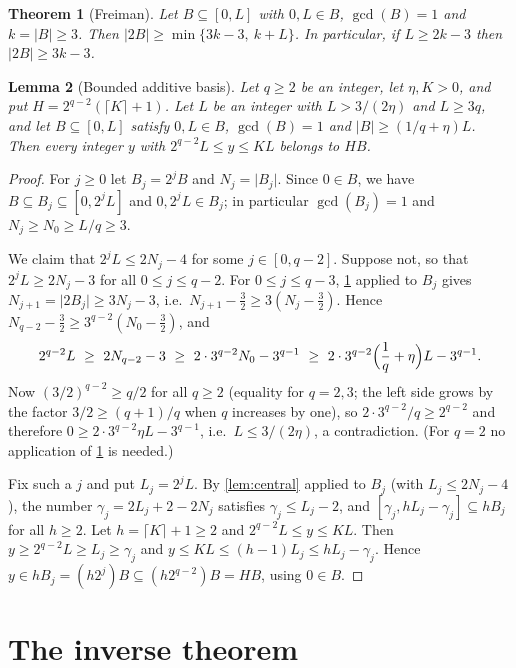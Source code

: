 \documentclass[11pt,reqno]{amsart}
\numberwithin{equation}{section}
\newtheorem{theorem}{Theorem}[section]
\newtheorem{lemma}[theorem]{Lemma}
\theoremstyle{definition}
\theoremstyle{remark}
\newcommand{\card}[1]{\lvert #1\rvert}
\newcommand{\ceil}[1]{\lceil #1\rceil}
\begin{document}
\begin{theorem}[Freiman]\label{thm:freiman}
Let $B\subseteq[0,L]$ with $0,L\in B$, $\gcd(B)=1$ and $k=\card B\ge3$. Then $\card{2B}\ge\min\{3k-3,\ k+L\}$. In particular, if $L\ge2k-3$ then $\card{2B}\ge3k-3$.
\end{theorem}

\begin{lemma}[Bounded additive basis]\label{lem:basis}
Let $q\ge2$ be an integer, let $\eta,K>0$, and put $H=2^{q-2}(\ceil K+1)$. Let $L$ be an integer with $L>3/(2\eta)$ and $L\ge3q$, and let $B\subseteq[0,L]$ satisfy $0,L\in B$, $\gcd(B)=1$ and $\card B\ge(1/q+\eta)L$. Then every integer $y$ with $2^{q-2}L\le y\le KL$ belongs to $HB$.
\end{lemma}

\begin{proof}
For $j\ge0$ let $B_j=2^jB$ and $N_j=\card{B_j}$. Since $0\in B$, we have $B\subseteq B_j\subseteq[0,2^jL]$ and $0,2^jL\in B_j$; in particular $\gcd(B_j)=1$ and $N_j\ge N_0\ge L/q\ge3$.

We claim that $2^jL\le2N_j-4$ for some $j\in[0,q-2]$. Suppose not, so that $2^jL\ge2N_j-3$ for all $0\le j\le q-2$. For $0\le j\le q-3$, \cref{thm:freiman} applied to $B_j$ gives $N_{j+1}=\card{2B_j}\ge3N_j-3$, i.e.\ $N_{j+1}-\frac32\ge3(N_j-\frac32)$. Hence $N_{q-2}-\frac32\ge3^{q-2}(N_0-\frac32)$, and
\[
 2^{q-2}L\ \ge\ 2N_{q-2}-3\ \ge\ 2\cdot3^{q-2}N_0-3^{q-1}\ \ge\ 2\cdot3^{q-2}\Bigl(\frac1q+\eta\Bigr)L-3^{q-1}.
\]
Now $(3/2)^{q-2}\ge q/2$ for all $q\ge2$ (equality for $q=2,3$; the left side grows by the factor $3/2\ge(q+1)/q$ when $q$ increases by one), so $2\cdot3^{q-2}/q\ge2^{q-2}$ and therefore $0\ge2\cdot3^{q-2}\eta L-3^{q-1}$, i.e.\ $L\le3/(2\eta)$, a contradiction. (For $q=2$ no application of \cref{thm:freiman} is needed.)

Fix such a $j$ and put $L_j=2^jL$. By \cref{lem:central} applied to $B_j$ (with $L_j\le2N_j-4$), the number $\gamma_j=2L_j+2-2N_j$ satisfies $\gamma_j\le L_j-2$, and $[\gamma_j,hL_j-\gamma_j]\subseteq hB_j$ for all $h\ge2$. Let $h=\ceil K+1\ge2$ and $2^{q-2}L\le y\le KL$. Then $y\ge2^{q-2}L\ge L_j\ge\gamma_j$ and $y\le KL\le(h-1)L_j\le hL_j-\gamma_j$. Hence $y\in hB_j=(h2^j)B\subseteq(h2^{q-2})B=HB$, using $0\in B$.
\end{proof}

\section{The inverse theorem}\label{sec:inverse}
\end{document}
